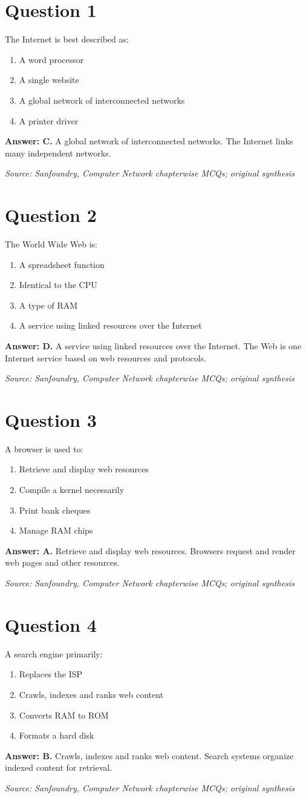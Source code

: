 \documentclass[11pt,a4paper]{book}
\newcommand{\source}[1]{\par\smallskip\textit{Source: #1}}
\newcommand{\answer}[2]{\par\textbf{Answer: #1.} #2}
\begin{document}
\section*{Question 1}
The Internet is best described as:
\begin{enumerate}[label=\Alph*.]
\item A word processor
\item A single website
\item A global network of interconnected networks
\item A printer driver
\end{enumerate}
\answer{C}{A global network of interconnected networks. The Internet links many independent networks.}
\source{Sanfoundry, Computer Network chapterwise MCQs; original synthesis}
\section*{Question 2}
The World Wide Web is:
\begin{enumerate}[label=\Alph*.]
\item A spreadsheet function
\item Identical to the CPU
\item A type of RAM
\item A service using linked resources over the Internet
\end{enumerate}
\answer{D}{A service using linked resources over the Internet. The Web is one Internet service based on web resources and protocols.}
\source{Sanfoundry, Computer Network chapterwise MCQs; original synthesis}
\section*{Question 3}
A browser is used to:
\begin{enumerate}[label=\Alph*.]
\item Retrieve and display web resources
\item Compile a kernel necessarily
\item Print bank cheques
\item Manage RAM chips
\end{enumerate}
\answer{A}{Retrieve and display web resources. Browsers request and render web pages and other resources.}
\source{Sanfoundry, Computer Network chapterwise MCQs; original synthesis}
\section*{Question 4}
A search engine primarily:
\begin{enumerate}[label=\Alph*.]
\item Replaces the ISP
\item Crawls, indexes and ranks web content
\item Converts RAM to ROM
\item Formats a hard disk
\end{enumerate}
\answer{B}{Crawls, indexes and ranks web content. Search systems organize indexed content for retrieval.}
\source{Sanfoundry, Computer Network chapterwise MCQs; original synthesis}
\end{document}
